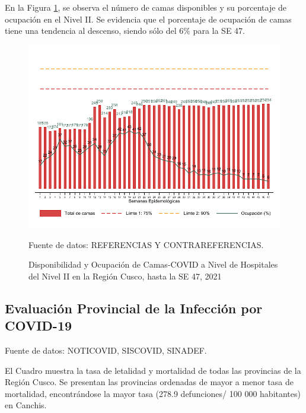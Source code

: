\documentclass[12pt,a4paper,openany]{book}
\begin{document}
\clearpage

En la Figura \ref{fig:ocupacion_2nivel}, se observa el número de camas disponibles y su porcentaje de ocupación en el Nivel II. Se evidencia que el porcentaje de ocupación de camas tiene una tendencia al descenso, siendo sólo del 6$\%$ para la SE 47. 

\begin{figure}[h]
	\caption{Disponibilidad y Ocupación de Camas-COVID a Nivel de Hospitales del Nivel II en la Región Cusco, hasta la SE 47, 2021}\label{fig:ocupacion_2nivel}
	\begin{center}
		\includegraphics[width=0.95\linewidth]{../figuras/nivel_2.pdf}
	\end{center}
	{\footnotesize {Fuente de datos: REFERENCIAS Y CONTRAREFERENCIAS.}}
\end{figure}
\clearpage
\begin{landscape}
	
	\subsection*{Evaluación Provincial de la Infección por COVID-19} 
	
	
	{\footnotesize Fuente de datos: NOTICOVID, SISCOVID, SINADEF.}
	
	\noindent El Cuadro muestra la tasa de letalidad y mortalidad de todas las provincias de la Región Cusco. Se presentan las provincias ordenadas de mayor a menor tasa de mortalidad, encontrándose la mayor tasa (278.9 defunciones/ 100 000 habitantes) en Canchis. 
	
\end{landscape}
\end{document}
